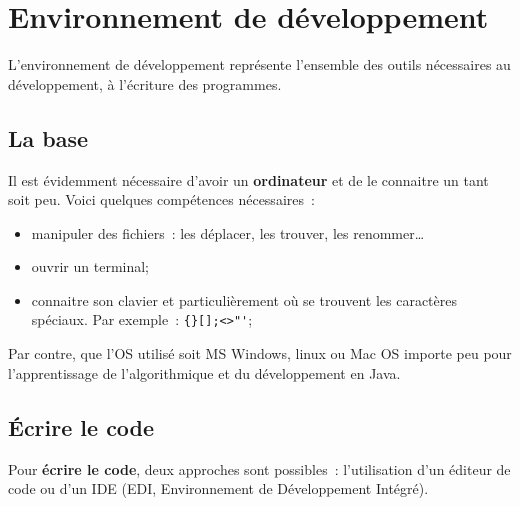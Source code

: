  


%
%
%
%
\section{Environnement de développement}

L'environnement de développement représente l'ensemble des outils nécessaires au
développement, à l'écriture des programmes. 

\subsection{La base}

Il est évidemment nécessaire d'avoir un \textbf{ordinateur} et de le connaitre 
un tant soit peu. Voici quelques compétences nécessaires~:

\begin{itemize}
	\item manipuler des fichiers~: les déplacer, les trouver, les renommer…
	\item ouvrir un terminal;
	\item connaitre son clavier et particulièrement où se trouvent les caractères
		spéciaux. Par exemple~: \verb|{}[];<>"'|;

\end{itemize}

Par contre, que l'OS utilisé soit MS Windows, linux ou Mac OS importe peu pour 
l'apprentissage de l'algorithmique et du développement en Java. 

\subsection{Écrire le code}

Pour \textbf{écrire le code}, deux approches sont possibles~: l'utilisation 
d'un éditeur de code ou d'un IDE (EDI, Environnement de Développement Intégré).

